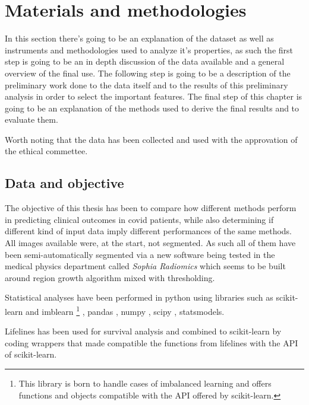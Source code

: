 \chapter{Materials and methodologies}\label{cap: Material_method}
In this section there's going to be an explanation of the dataset as well as instruments and methodologies used to analyze it's properties, as such the first step is going to be an in depth discussion of the data available and a general overview of the final use. The following step is going to be a description of the preliminary work done to the data itself and to the results of this preliminary analysis in order to select the important features. The final step of this chapter is going to be an explanation of the methods used to derive the final results and to evaluate them.

Worth noting that the data has been collected and used with the approvation of the ethical commettee.

\section{Data and objective}
\label{chap:freefree}
The objective of this thesis has been to compare how different methods perform in predicting clinical outcomes in covid patients, while also determining if different kind of input data imply different performances of the same methods.
All images available were, at the start, not segmented. As such all of them have been semi-automatically segmented via a new software being tested in the medical physics department called \textit{Sophia Radiomics} \cite{Sophiarad} which seems to be built around region growth algorithm mixed with thresholding. 

Statistical analyses have been performed in python using libraries such as scikit-learn \cite{sklearn} and imblearn
\footnote{This library is born to handle cases of imbalanced learning and offers functions and objects compatible with the API offered by scikit-learn.} \cite{imblearn}, pandas \cite{pandas}, numpy \cite{numpy}, scipy \cite{scipy}, statsmodels\cite{statsmodels}.

Lifelines \cite{lifelines} has been used for survival analysis and combined to scikit-learn by coding wrappers that made compatible the functions from lifelines with the API of scikit-learn.

